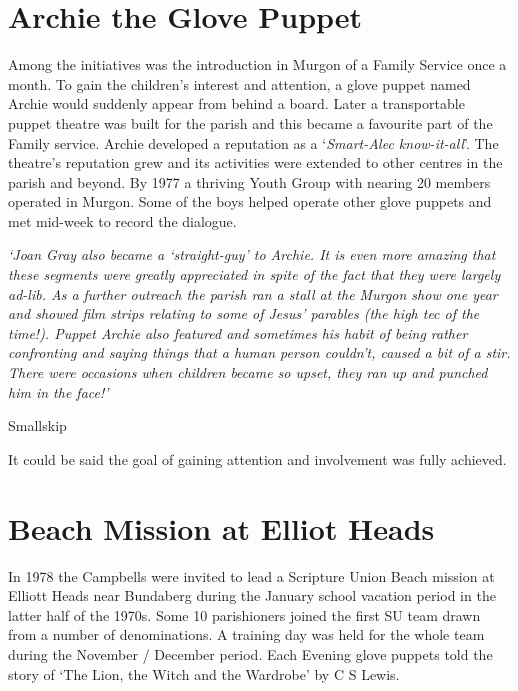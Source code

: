 \hypertarget{archie-the-glove-puppet}{%
\section{Archie the Glove Puppet}\label{archie-the-glove-puppet}}

Among the initiatives was the introduction in Murgon of a Family Service once a month. To gain the children's interest and attention, a glove puppet named Archie would suddenly appear from behind a board. Later a transportable puppet theatre was built for the parish and this became a favourite part of the Family service. Archie developed a reputation as a `\emph{Smart-Alec know-it-all}'. The theatre's reputation grew and its activities were extended to other centres in the parish and beyond. By 1977 a thriving Youth Group with nearing 20 members operated in Murgon. Some of the boys helped operate other glove puppets and met mid-week to record the dialogue.

\emph{`Joan Gray also became a `straight-guy' to Archie. It is even more amazing that these segments were greatly appreciated in spite of the fact that they were largely ad-lib. As a further outreach the parish ran a stall at the Murgon show one year and showed film strips relating to some of Jesus' parables (the high tec of the time!). Puppet Archie also featured and sometimes his habit of being rather confronting and saying things that a human person couldn't, caused a bit of a stir. There were occasions when children became so upset, they ran up and punched him in the face!'}

Smallskip

It could be said the goal of gaining attention and involvement was fully achieved.

\hypertarget{beach-mission-at-elliot-heads}{%
\section{Beach Mission at Elliot Heads}\label{beach-mission-at-elliot-heads}}

In 1978 the Campbells were invited to lead a Scripture Union Beach mission at Elliott Heads near Bundaberg during the January school vacation period in the latter half of the 1970s. Some 10 parishioners joined the first SU team drawn from a number of denominations. A training day was held for the whole team during the November / December period. Each Evening glove puppets told the story of `The Lion, the Witch and the Wardrobe' by C S Lewis.

